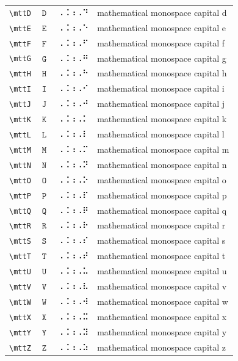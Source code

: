 \documentclass[oneside]{article}
\begin{document}
\begin{longtable}{llll}
\verb|\mttD| & $\mttD$ &  ⠠⠨⠰⠠⠙  & {mathematical monospace capital d} \\[2ex]
\verb|\mttE| & $\mttE$ &  ⠠⠨⠰⠠⠑  & {mathematical monospace capital e} \\[2ex]
\verb|\mttF| & $\mttF$ &  ⠠⠨⠰⠠⠋  & {mathematical monospace capital f} \\[2ex]
\verb|\mttG| & $\mttG$ &  ⠠⠨⠰⠠⠛  & {mathematical monospace capital g} \\[2ex]
\verb|\mttH| & $\mttH$ &  ⠠⠨⠰⠠⠓  & {mathematical monospace capital h} \\[2ex]
\verb|\mttI| & $\mttI$ &  ⠠⠨⠰⠠⠊  & {mathematical monospace capital i} \\[2ex]
\verb|\mttJ| & $\mttJ$ &  ⠠⠨⠰⠠⠚  & {mathematical monospace capital j} \\[2ex]
\verb|\mttK| & $\mttK$ &  ⠠⠨⠰⠠⠅  & {mathematical monospace capital k} \\[2ex]
\verb|\mttL| & $\mttL$ &  ⠠⠨⠰⠠⠇  & {mathematical monospace capital l} \\[2ex]
\verb|\mttM| & $\mttM$ &  ⠠⠨⠰⠠⠍  & {mathematical monospace capital m} \\[2ex]
\verb|\mttN| & $\mttN$ &  ⠠⠨⠰⠠⠝  & {mathematical monospace capital n} \\[2ex]
\verb|\mttO| & $\mttO$ &  ⠠⠨⠰⠠⠕  & {mathematical monospace capital o} \\[2ex]
\verb|\mttP| & $\mttP$ &  ⠠⠨⠰⠠⠏  & {mathematical monospace capital p} \\[2ex]
\verb|\mttQ| & $\mttQ$ &  ⠠⠨⠰⠠⠟  & {mathematical monospace capital q} \\[2ex]
\verb|\mttR| & $\mttR$ &  ⠠⠨⠰⠠⠗  & {mathematical monospace capital r} \\[2ex]
\verb|\mttS| & $\mttS$ &  ⠠⠨⠰⠠⠎  & {mathematical monospace capital s} \\[2ex]
\verb|\mttT| & $\mttT$ &  ⠠⠨⠰⠠⠞  & {mathematical monospace capital t} \\[2ex]
\verb|\mttU| & $\mttU$ &  ⠠⠨⠰⠠⠥  & {mathematical monospace capital u} \\[2ex]
\verb|\mttV| & $\mttV$ &  ⠠⠨⠰⠠⠧  & {mathematical monospace capital v} \\[2ex]
\verb|\mttW| & $\mttW$ &  ⠠⠨⠰⠠⠺  & {mathematical monospace capital w} \\[2ex]
\verb|\mttX| & $\mttX$ &  ⠠⠨⠰⠠⠭  & {mathematical monospace capital x} \\[2ex]
\verb|\mttY| & $\mttY$ &  ⠠⠨⠰⠠⠽  & {mathematical monospace capital y} \\[2ex]
\verb|\mttZ| & $\mttZ$ &  ⠠⠨⠰⠠⠵  & {mathematical monospace capital z} \\[2ex]

\end{longtable}
\end{document}
